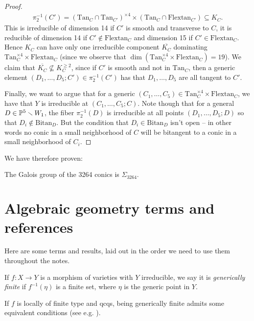\documentclass[11pt]{amsart}
\providecommand{\Bitan}{\mathrm{Bitan}}
\providecommand{\Flextan}{\mathrm{Flextan}}
\providecommand{\Tan}{\mathrm{Tan}}
\begin{document}
\begin{proof}
\begin{align*}
    \pi_2^{-1}(C') = (\Tan_C \cap \Tan_{C'})^{\times4} \times (\Tan_C \cap \Flextan_{C'}) \subseteq K_C.
\end{align*}
This is irreducible of dimension 14 if $C'$ is smooth and transverse to $C$, it is reducible of dimension 14 if $C' \notin \Flextan_C$ and dimension 15 if $C' \in \Flextan_C$. Hence $K_C$ can have only one irreducible component $\overline{K_C}$ dominating $\Tan_C^{\times 4}\times\Flextan_C$ (since we observe that $\dim (\Tan_C^{\times 4}\times\Flextan_C) =19$). We claim that $\overline{K_C} \not\subseteq K_C^{\ge 2}$, since if $C'$ is smooth and not in $\Tan_C$, then a generic element $(D_1, \ldots, D_5;C') \in \pi_2^{-1}(C')$ has that $D_1, \ldots, D_5$ are all tangent to $C'$.

Finally, we want to argue that for a generic $(C_1, \ldots, C_5) \in \Tan_C^{\times 4}\times\Flextan_C$, we have that $Y$ is irreducible at $(C_1, \ldots, C_5;C)$. Note though that for a general $D\in \mathbb{P}^5\smallsetminus W_1$, the fiber $\pi_2^{-1}(D)$ is irreducible at all points $(D_1, \ldots, D_5;D)$ so that $D_i \notin \Bitan_D$. But the condition that $D_i \in \Bitan_D$ isn't open -- in other words no conic in a small neighborhood of $C$ will be bitangent to a conic in a small neighborhood of $C_i$.
\end{proof}

We have therefore proven:

\begin{theorem} The Galois group of the 3264 conics is $\Sigma_{3264}$.
\end{theorem}


\appendix

\section{Algebraic geometry terms and references}

Here are some terms and results, laid out in the order we need to use them throughout the notes.

\begin{definition}
\label{def:generically-finite}
If $f \colon X \to Y$ is a morphism of varieties with $Y$ irreducible, we say it is \textit{generically finite} if $f^{-1}(\eta)$ is a finite set, where $\eta$ is the generic point in $Y$.
\end{definition}

\begin{remark} If $f$ is locally of finite type and qcqs, being generically finite admits some equivalent conditions (see e.g. \cite[02NW]{Stacks}).
\end{remark}
\end{document}
